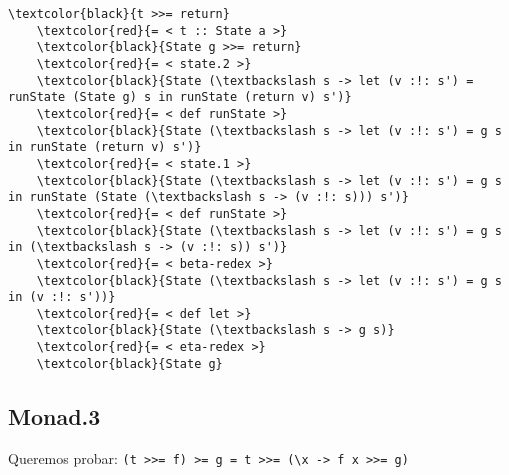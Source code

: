 \documentclass[11pt]{article}
\begin{document}
\begin{Verbatim}[commandchars=\\\{\}]
    \textcolor{black}{t >>= return}
    \textcolor{red}{= < t :: State a >}
    \textcolor{black}{State g >>= return}
    \textcolor{red}{= < state.2 >}
    \textcolor{black}{State (\textbackslash s -> let (v :!: s') = runState (State g) s in runState (return v) s')}
    \textcolor{red}{= < def runState >}
    \textcolor{black}{State (\textbackslash s -> let (v :!: s') = g s in runState (return v) s')}
    \textcolor{red}{= < state.1 >}
    \textcolor{black}{State (\textbackslash s -> let (v :!: s') = g s in runState (State (\textbackslash s -> (v :!: s))) s')}
    \textcolor{red}{= < def runState >}
    \textcolor{black}{State (\textbackslash s -> let (v :!: s') = g s in (\textbackslash s -> (v :!: s)) s')}
    \textcolor{red}{= < beta-redex >}
    \textcolor{black}{State (\textbackslash s -> let (v :!: s') = g s in (v :!: s'))}
    \textcolor{red}{= < def let >}
    \textcolor{black}{State (\textbackslash s -> g s)}
    \textcolor{red}{= < eta-redex >}
    \textcolor{black}{State g}
\end{Verbatim}

\subsection*{Monad.3}

Queremos probar: \texttt{(t >>= f) >= g  \;\;=\;\; t >>= (\textbackslash x -> f x >>= g)}
\end{document}
